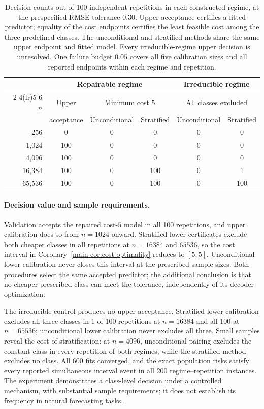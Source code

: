 \begin{table}[t]
\centering
\small
\begin{tabular}{rccccc}
\toprule
 & \multicolumn{3}{c}{Repairable regime} & \multicolumn{2}{c}{Irreducible regime} \\
\cmidrule(lr){2-4}\cmidrule(lr){5-6}
$n$ & Upper & \multicolumn{2}{c}{Minimum cost $5$} & \multicolumn{2}{c}{All classes excluded} \\
 & acceptance & Unconditional & Stratified & Unconditional & Stratified \\
\midrule
256 & 0 & 0 & 0 & 0 & 0 \\
1,024 & 100 & 0 & 0 & 0 & 0 \\
4,096 & 100 & 0 & 0 & 0 & 0 \\
16,384 & 100 & 0 & 100 & 0 & 1 \\
65,536 & 100 & 0 & 100 & 0 & 100 \\
\bottomrule
\end{tabular}
\caption{Decision counts out of 100 independent repetitions in each constructed regime, at the prespecified RMSE tolerance $0.30$. Upper acceptance certifies a fitted predictor; equality of the cost endpoints certifies the least feasible cost among the three predefined classes. The unconditional and stratified methods share the same upper endpoint and fitted model. Every irreducible-regime upper decision is unresolved. One failure budget $0.05$ covers all five calibration sizes and all reported endpoints within each regime and repetition.}
\label{tab:decision-outcomes}
\end{table}


\paragraph{Decision value and sample requirements.}
Validation accepts the repaired cost-$5$ model in all 100 repetitions, and
upper calibration does so from $n=1024$ onward. Stratified lower certificates
exclude both cheaper classes in all repetitions at $n=16384$ and $65536$,
so the cost interval in Corollary~\ref{main-cor:cost-optimality} reduces to
$[5,5]$. Unconditional lower calibration never closes this interval at the
prescribed sample sizes. Both procedures select the same accepted predictor;
the additional conclusion is that no cheaper prescribed class can meet the
tolerance, independently of its decoder optimization.

The irreducible control produces no upper acceptance. Stratified lower
calibration excludes all three classes in 1 of 100 repetitions at $n=16384$
and all 100 at $n=65536$; unconditional lower calibration never excludes all
three. Small samples reveal the cost of stratification: at $n=4096$,
unconditional pairing excludes the constant class in every repetition of
both regimes, while the stratified method excludes no class. All 600 fits
converged, and the exact population risks satisfy every reported simultaneous
interval event in all 200 regime--repetition instances. The experiment
demonstrates a class-level decision under a controlled mechanism, with
substantial sample requirements; it does not establish its frequency in
natural forecasting tasks.

